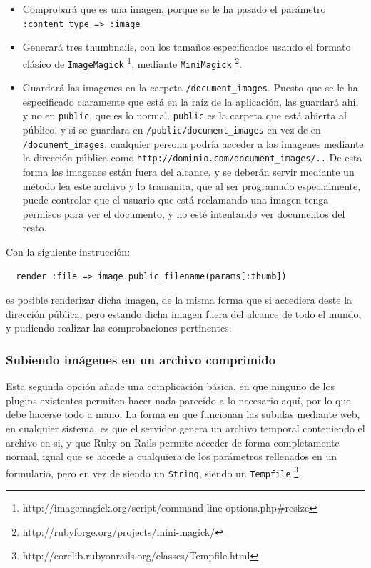\begin{itemize}
  \item Comprobará que es una imagen, porque se le ha pasado el parámetro \texttt{:content\_type => :image}
  \item Generará tres thumbnails, con los tamaños especificados usando el formato clásico de \texttt{ImageMagick} \footnote{http://imagemagick.org/script/command-line-options.php\#resize}, mediante \texttt{MiniMagick} \footnote{http://rubyforge.org/projects/mini-magick/}.
  \item Guardará las imagenes en la carpeta \texttt{/document\_images}. Puesto que se le ha especificado claramente que está en la raíz de la aplicación, las guardará ahí, y no en \texttt{public}, que es lo normal. \texttt{public} es la carpeta que está abierta al público, y si se guardara en \texttt{/public/document\_images} en vez de en \texttt{/document\_images}, cualquier persona podría acceder a las imagenes mediante la dirección pública como \texttt{http://dominio.com/document\_images/..}
  De esta forma las imagenes están fuera del alcance, y se deberán servir mediante un método lea este archivo y lo transmita, que al ser programado especialmente, puede controlar que el usuario que está reclamando una imagen tenga permisos para ver el documento, y no esté intentando ver documentos del resto.
\end{itemize}

Con la siguiente instrucción:

\begin{verbatim}
  render :file => image.public_filename(params[:thumb])
\end{verbatim}

es posible renderizar dicha imagen, de la misma forma que si accediera deste la dirección pública, pero estando dicha imagen fuera del alcance de todo el mundo, y pudiendo realizar las comprobaciones pertinentes.


\subsubsection{Subiendo imágenes en un archivo comprimido} %
\label{ssub:subiendo_imágenes_en_un_archivo_comprimido}

Esta segunda opción añade una complicación básica, en que ninguno de los plugins existentes permiten hacer nada parecido a lo necesario aquí, por lo que debe hacerse todo a mano. La forma en que funcionan las subidas mediante web, en cualquier sistema, es que el servidor genera un archivo temporal conteniendo el archivo en si, y que Ruby on Rails permite acceder de forma completamente normal, igual que se accede a cualquiera de los parámetros rellenados en un formulario, pero en vez de siendo un \texttt{String}, siendo un \texttt{Tempfile} \footnote{http://corelib.rubyonrails.org/classes/Tempfile.html}. 

